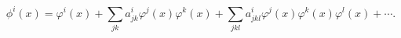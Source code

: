 \begin{equation}
\phi^i(x)=\varphi^i(x)+\sum_{jk} a^i_{jk}\varphi^j(x)\varphi^k(x)+
\sum_{jkl} a^i_{jkl}\varphi^j(x)\varphi^k(x)\varphi^l(x)+\cdots .
\label{kostr}
\end{equation}

